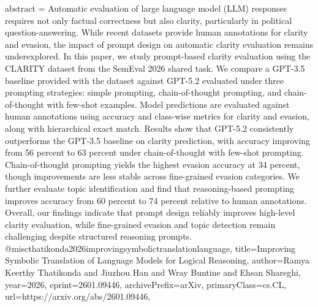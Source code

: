 {      abstract = {Automatic evaluation of large language model (LLM) responses requires not only factual correctness but also clarity, particularly in political question-answering. While recent datasets provide human annotations for clarity and evasion, the impact of prompt design on automatic clarity evaluation remains underexplored. In this paper, we study prompt-based clarity evaluation using the CLARITY dataset from the SemEval 2026 shared task. We compare a GPT-3.5 baseline provided with the dataset against GPT-5.2 evaluated under three prompting strategies: simple prompting, chain-of-thought prompting, and chain-of-thought with few-shot examples. Model predictions are evaluated against human annotations using accuracy and class-wise metrics for clarity and evasion, along with hierarchical exact match. Results show that GPT-5.2 consistently outperforms the GPT-3.5 baseline on clarity prediction, with accuracy improving from 56 percent to 63 percent under chain-of-thought with few-shot prompting. Chain-of-thought prompting yields the highest evasion accuracy at 34 percent, though improvements are less stable across fine-grained evasion categories. We further evaluate topic identification and find that reasoning-based prompting improves accuracy from 60 percent to 74 percent relative to human annotations. Overall, our findings indicate that prompt design reliably improves high-level clarity evaluation, while fine-grained evasion and topic detection remain challenging despite structured reasoning prompts.}
}@misc{thatikonda2026improvingsymbolictranslationlanguage,
      title={Improving Symbolic Translation of Language Models for Logical Reasoning}, 
      author={Ramya Keerthy Thatikonda and Jiuzhou Han and Wray Buntine and Ehsan Shareghi},
      year={2026},
      eprint={2601.09446},
      archivePrefix={arXiv},
      primaryClass={cs.CL},
      url={https://arxiv.org/abs/2601.09446},
}

